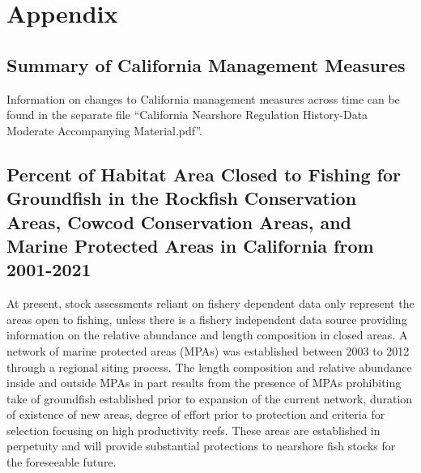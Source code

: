 \documentclass[11pt,
  english,
  a4paper,
]{article}
\begin{document}
\tagmcend\tagstructend

\clearpage


\hypertarget{appendix}{%
\section{Appendix}\label{appendix}}

\leavevmode\tagmcend\tagstructend


\hypertarget{ca-man}{%
\subsection{Summary of California Management Measures}\label{ca-man}}

\leavevmode\tagmcend\tagstructend


Information on changes to California management measures across time can be found in the separate file ``California Nearshore Regulation History-Data Moderate Accompanying Material.pdf''.

\leavevmode\tagmcend\tagstructend\par


\hypertarget{percent-of-habitat-area-closed-to-fishing-for-groundfish-in-the-rockfish-conservation-areas-cowcod-conservation-areas-and-marine-protected-areas-in-california-from-2001-2021}{%
\subsection{Percent of Habitat Area Closed to Fishing for Groundfish in the Rockfish Conservation Areas, Cowcod Conservation Areas, and Marine Protected Areas in California from 2001-2021}\label{percent-of-habitat-area-closed-to-fishing-for-groundfish-in-the-rockfish-conservation-areas-cowcod-conservation-areas-and-marine-protected-areas-in-california-from-2001-2021}}

\leavevmode\tagmcend\tagstructend


At present, stock assessments reliant on fishery dependent data only represent the areas open to fishing, unless there is a fishery independent data source providing information on the relative abundance and length composition in closed areas. A network of marine protected areas (MPAs) was established between 2003 to 2012 through a regional siting process. The length composition and relative abundance inside and outside MPAs in part results from the presence of MPAs prohibiting take of groundfish established prior to expansion of the current network, duration of existence of new areas, degree of effort prior to protection and criteria for selection focusing on high productivity reefs. These areas are established in perpetuity and will provide substantial protections to nearshore fish stocks for the foreseeable future.
\end{document}
